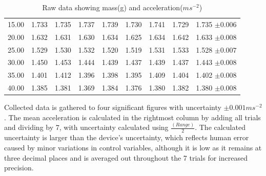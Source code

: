 \documentclass[11pt]{article}
\begin{document}
\begin{table}[h]
\begin{tabular}{ccccccccc}
15.00                                                    & 1.733                & 1.735                & 1.737                & 1.739                & 1.730                & 1.741               & 1.729               & 1.735 $\pm0.006$                                                                 \\
\rowcolor[HTML]{EFEFEF} 
20.00                                                    & 1.632                & 1.631                & 1.630                 & 1.634                & 1.625               & 1.634               & 1.642               & 1.633 $\pm0.008$                                                               \\
25.00                                                    & 1.529                & 1.530                 & 1.532                & 1.520                 & 1.519               & 1.531               & 1.533               & 1.528 $\pm0.007$                                                                \\
\rowcolor[HTML]{EFEFEF} 
30.00                                                    & 1.450                & 1.453                 & 1.444                & 1.439                & 1.437               & 1.439               & 1.437               & 1.443 $\pm0.008$                                                                \\
35.00                                                    & 1.401                & 1.412                & 1.396                & 1.398                & 1.395               & 1.409               & 1.404               & 1.402 $\pm0.008$                                                                \\
\rowcolor[HTML]{EFEFEF} 
40.00                                                    & 1.385                & 1.381                & 1.369                & 1.384                & 1.376               & 1.380                & 1.382               & 1.380 $\pm0.008$                                                               
\end{tabular}
\caption{\label{tbl:1}Raw data showing mass(g) and acceleration($ms^{-2}$)}
\end{table}



Collected data is gathered to four significant figures with uncertainty $\pm0.001ms^{-2}$. The mean acceleration is calculated in the rightmost column by adding all trials and dividing by 7, with uncertainty calculated using $\frac{(Range)}{2}$. The calculated uncertainty is larger than the device's uncertainty, which reflects human error caused by minor variations in control variables, although it is low as it remains at three decimal places and is averaged out throughout the 7 trials for increased precision. 
\end{document}
